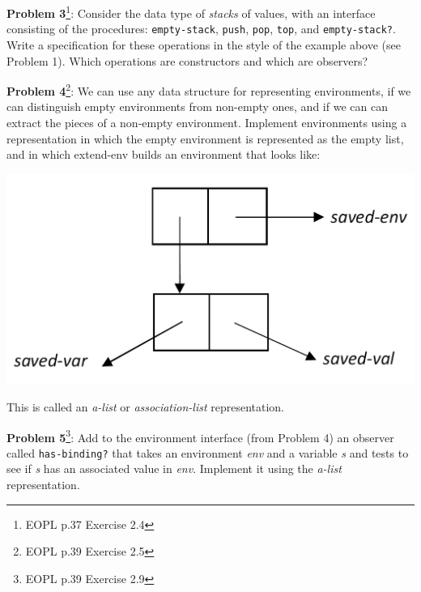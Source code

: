 \documentclass[12pt,reqno]{amsart}
\newcommand{\code}[1]{\texttt{#1}}
\begin{document}
\vspace{7.5mm}

\textbf{Problem 3}\footnote{EOPL p.37 Exercise 2.4}: Consider the data type of \textit{stacks} of values, with an interface consisting of the procedures: \code{empty-stack}, \code{push}, \code{pop}, \code{top}, and \code{empty-stack?}. Write a specification for these operations in the style of the example above (see Problem 1). Which operations are constructors and which are observers?

\newpage

\textbf{Problem 4}\footnote{EOPL p.39 Exercise 2.5}: We can use any data structure for representing environments, if we can distinguish empty environments from non-empty ones, and if we can can extract the pieces of a non-empty environment. Implement environments using a representation in which the empty environment is represented as the empty list, and in which extend-env builds an environment that looks like:

\includegraphics[width=\textwidth]{PS2Q4.PNG}

This is called an \textit{a-list} or \textit{association-list} representation.

\vspace{7.5mm}

\textbf{Problem 5}\footnote{EOPL p.39 Exercise 2.9}: Add to the environment interface (from Problem 4) an observer called \code{has-binding?} that takes an environment \textit{env} and a variable \textit{s} and tests to see if \textit{s} has an associated value in \textit{env}. Implement it using the \textit{a-list} representation.
\end{document}
